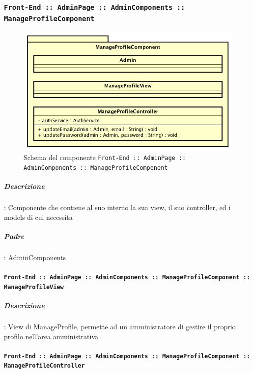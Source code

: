 \documentclass[../DefinizioneDiProdotto_v2.0.0.tex]{subfiles}
\begin{document}
	\subsubsection{\texttt{Front-End :: AdminPage :: AdminComponents :: ManageProfileComponent}}
	\begin{figure}[!h]
		\centering
		\includegraphics[scale=0.6]{Architettura/Front-End/AdminPage/AdminComponents/ManageProfileComponent.png}
		\caption{Schema del componente \texttt{Front-End :: AdminPage :: AdminComponents :: ManageProfileComponent}}
	\end{figure}
			\subparagraph{Descrizione}: Componente che contiene al suo interno la sua view, il suo controller, ed i models di cui necessita
			\subparagraph{Padre}: AdminComponents
				\paragraph{\texttt{Front-End :: AdminPage :: AdminComponents :: ManageProfileComponent :: ManageProfileView}}
					\subparagraph{Descrizione}: View di ManageProfile, permette ad un amministratore di gestire il proprio profilo nell'area amministrativa
				\paragraph{\texttt{Front-End :: AdminPage :: AdminComponents :: ManageProfileComponent :: ManageProfileController}}
\end{document}
